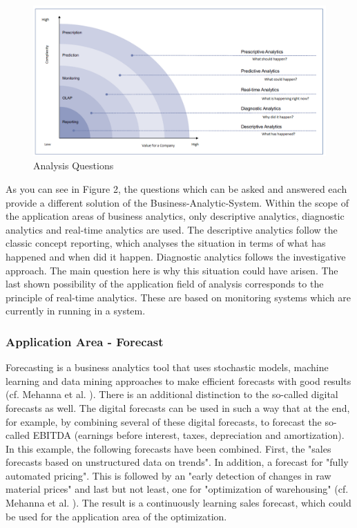 \documentclass[12pt,twocolumn,twoside]{conference}   %
\begin{document}
\begin{figure}
\centering
\includegraphics[width=16cm]{Abbildungen/Analysis.png}
\caption{Analysis Questions \cite{2}}\label{visina8}
\end{figure}


As you can see in Figure 2, the questions which can be asked and answered  each provide a different solution of the Business-Analytic-System. Within the scope of the application areas of business analytics, only descriptive analytics, diagnostic analytics and real-time analytics are used. The descriptive analytics follow the classic concept reporting, which analyses the situation in terms of what has happened and when did it happen. Diagnostic analytics follows the investigative approach. The main question here is why this situation could have arisen. The last shown possibility of the application field of analysis corresponds to the principle of real-time analytics. These are based on monitoring systems which are currently in running in a system. 

\subsubsection{Application Area - Forecast}
Forecasting is a business analytics tool that uses stochastic models, machine learning and data mining approaches to make efficient forecasts with good results (cf. Mehanna et al. \cite{2}). There is an additional distinction to the so-called digital forecasts as well. The digital forecasts can be used in such a way that at the end, for example, by combining several of these digital forecasts, to forecast the so-called EBITDA (earnings before interest, taxes, depreciation and amortization). In this example, the following forecasts have been combined. First, the "sales forecasts based on unstructured data on trends". In addition, a forecast for "fully automated pricing". This is followed by an "early detection of changes in raw material prices" and last but not least, one for "optimization of warehousing" (cf. Mehanna et al. \cite{2}). The result is a continuously learning sales forecast, which could be used for the application area of the optimization.
\end{document}
